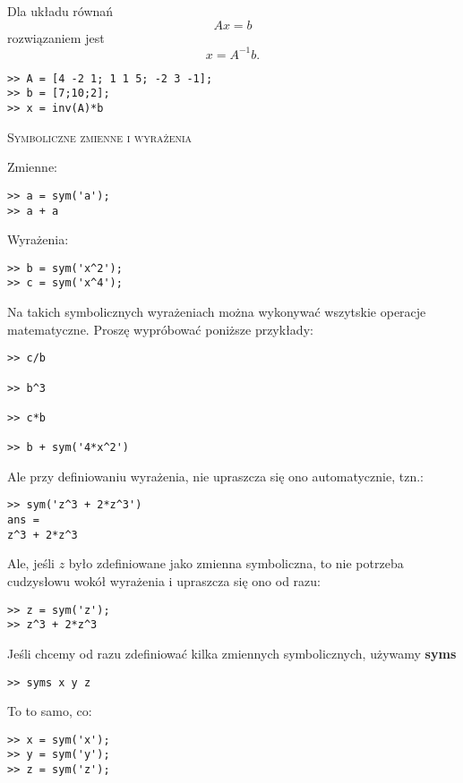 \documentclass[12pt]{amsbook}
\theoremstyle{definition}
\begin{document}
Dla układu równań $$Ax = b$$ rozwiązaniem jest $$x = A^{-1}b.$$

\begin{lstlisting}
>> A = [4 -2 1; 1 1 5; -2 3 -1];
>> b = [7;10;2];
>> x = inv(A)*b
\end{lstlisting}


\begin{center}
\textsc{Symboliczne zmienne i wyrażenia}\\
\end{center}

Zmienne:

\begin{lstlisting}
>> a = sym('a');
>> a + a
\end{lstlisting}

Wyrażenia:

\begin{lstlisting}
>> b = sym('x^2');
>> c = sym('x^4');
\end{lstlisting}


Na takich symbolicznych wyrażeniach można wykonywać wszytskie operacje matematyczne.
Proszę wypróbować poniższe przykłady:


\begin{lstlisting}
>> c/b

>> b^3

>> c*b

>> b + sym('4*x^2')

\end{lstlisting}

Ale przy definiowaniu wyrażenia, nie upraszcza się ono automatycznie, tzn.:

\begin{lstlisting}
>> sym('z^3 + 2*z^3')
ans =
z^3 + 2*z^3
\end{lstlisting}

Ale, jeśli $z$ było zdefiniowane jako zmienna symboliczna, to nie potrzeba cudzysłowu wokół wyrażenia i upraszcza się ono od razu:

\begin{lstlisting}
>> z = sym('z');
>> z^3 + 2*z^3
\end{lstlisting}

Jeśli chcemy od razu zdefiniować kilka zmiennych symbolicznych, używamy \textbf{syms}

\begin{lstlisting}
>> syms x y z
\end{lstlisting}

To to samo, co:
\begin{lstlisting}
>> x = sym('x');
>> y = sym('y');
>> z = sym('z');
\end{lstlisting}
\end{document}
